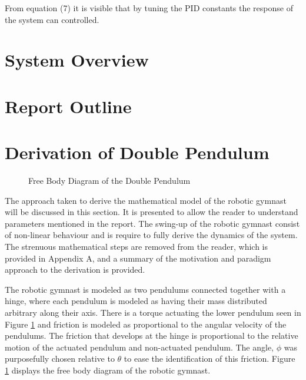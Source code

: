 \documentclass[a4paper,12pt]{article}
\begin{document}
 	From equation (7) it is visible that by tuning the PID constants the response of the system can controlled.
 	
 	
 	\section{System Overview}
 		
 	\section{Report Outline}
 	
 	
	\section{Derivation of Double Pendulum}
	\begin{figure}[h]
		\centering
		
		\caption{Free Body Diagram of the Double Pendulum}
		\label{fig:doublePen}
	\end{figure}

	The approach taken to derive the mathematical model of the robotic gymnast will be discussed in this section. It is presented to allow the reader to understand parameters mentioned in the report. The swing-up of the robotic gymnast consist of non-linear behaviour and is require to fully derive the dynamics of the system. The strenuous mathematical steps are removed from the reader, which is provided in Appendix A, and a summary of the motivation and paradigm approach to the derivation is provided.

	The robotic gymnast is modeled as two pendulums connected together with a hinge, where each pendulum is modeled as having their mass distributed arbitrary along their axis. There is a torque actuating the lower pendulum seen in Figure \ref{fig:doublePen} and friction is modeled as proportional to the angular velocity of the pendulums. The friction that develops at the hinge is proportional to the relative motion of the actuated pendulum and non-actuated pendulum. The angle, $\phi$ was purposefully chosen relative to $\theta$ to ease the identification of this friction. Figure \ref{fig:doublePen} displays the free body diagram of the robotic gymnast.
	
\end{document}

